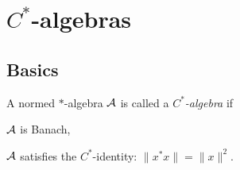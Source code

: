 \documentclass{../exp}
\begin{document}
\section{$C^*$-algebras}

\subsection{Basics}



\begin{defn}
A normed $*$-algebra $\mathcal{A}$ is called a \emph{$C^*$-algebra} if
\begin{cond}
\item $\mathcal{A}$ is Banach,
\item $\mathcal{A}$ satisfies the $C^*$-identity: $\|x^*x\|=\|x\|^2$.
\end{cond}
\end{defn}
\end{document}
